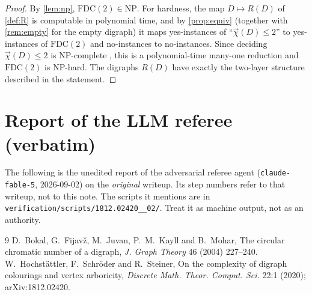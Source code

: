 \documentclass[11pt,a4paper]{article}
\theoremstyle{plain}
\theoremstyle{definition}
\theoremstyle{remark}
\newcommand{\dic}{\vec{\chi}}
\newcommand{\FDC}{\mathrm{FDC}}
\newcommand{\NP}{\mathrm{NP}}
\begin{document}
\label{pf:main}
\thmmain*
\begin{proof}
By \cref{lem:np}, $\FDC(2)\in\NP$. For hardness, the map $D\mapsto R(D)$ of \cref{def:R} is computable in polynomial time, and by \cref{prop:equiv} (together with \cref{rem:empty} for the empty digraph) it maps yes-instances of ``$\dic(D)\le2$'' to yes-instances of $\FDC(2)$ and no-instances to no-instances. Since deciding $\dic(D)\le2$ is NP-complete \cite{BFJKM04}, this is a polynomial-time many-one reduction and $\FDC(2)$ is NP-hard. The digraphs $R(D)$ have exactly the two-layer structure described in the statement.
\end{proof}

\section{Report of the LLM referee (verbatim)}\label{app:referee}

\begin{tcolorbox}[colback=gray!8,colframe=gray!50,boxrule=0.4pt,arc=2pt]
\small The following is the unedited report of the adversarial referee agent (\texttt{claude-fable-5}, 2026-09-02) on the \emph{original} writeup. Its step numbers refer to that writeup, not to this note. The scripts it mentions are in \texttt{verification/scripts/1812.02420\_\_02/}. Treat it as machine output, not as an authority.
\end{tcolorbox}



\begin{thebibliography}{9}
 D.~Bokal, G.~Fijavž, M.~Juvan, P.~M.~Kayll and B.~Mohar, The circular chromatic number of a digraph, \emph{J. Graph Theory} 46 (2004) 227--240.
 W.~Hochstättler, F.~Schröder and R.~Steiner, On the complexity of digraph colourings and vertex arboricity, \emph{Discrete Math. Theor. Comput. Sci.} 22:1 (2020); arXiv:1812.02420.
\end{thebibliography}
\end{document}
